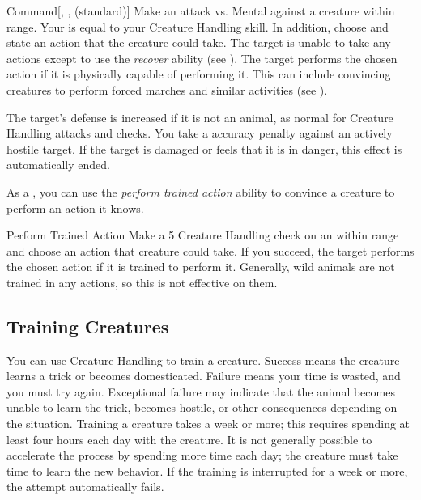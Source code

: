         \begin{freeability}{Command}[, ,  (standard)]
            \label{Command}
            Make an attack vs. Mental against a creature within \rngmed range.
            Your  is equal to your Creature Handling skill.
            In addition, choose and state an action that the creature could take.
            \hit The target is unable to take any actions except to use the \textit{recover} ability (see ).
            \crit The target performs the chosen action if it is physically capable of performing it.
            This can include convincing creatures to perform forced marches and similar activities (see ).
            
            The target's defense is increased if it is not an animal, as normal for Creature Handling attacks and checks.
            You take a  accuracy penalty against an actively hostile target.
            If the target is damaged or feels that it is in danger, this effect is automatically ended.
        \end{freeability}

        As a , you can use the \textit{perform trained action} ability to convince a creature to perform an action it knows.

        \begin{freeability}{Perform Trained Action}
            Make a  5 Creature Handling check on an  within \rnglong range and choose an action that creature could take.
            If you succeed, the target performs the chosen action if it is trained to perform it.
            Generally, wild animals are not trained in any actions, so this is not effective on them.
        \end{freeability}

    \subsection{Training Creatures}\label{Training Creatures}
        You can use Creature Handling to train a creature. Success means the creature learns a trick or becomes domesticated. Failure means your time is wasted, and you must try again. Exceptional failure may indicate that the animal becomes unable to learn the trick, becomes hostile, or other consequences depending on the situation. Training a creature takes a week or more; this requires spending at least four hours each day with the creature. It is not generally possible to accelerate the process by spending more time each day; the creature must take time to learn the new behavior. If the training is interrupted for a week or more, the attempt automatically fails.

